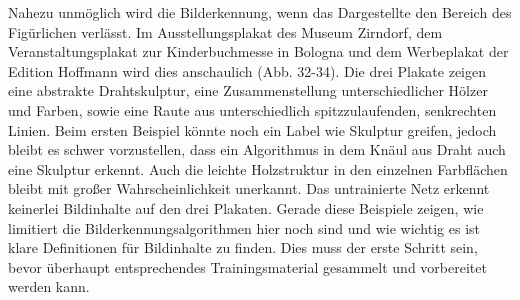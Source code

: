 \documentclass[a4paper,12pt,ngerman]{article}
\begin{document}
Nahezu unmöglich wird die Bilderkennung, wenn das Dargestellte den Bereich des Figürlichen verlässt. Im Ausstellungsplakat des Museum Zirndorf, dem Veranstaltungsplakat zur Kinderbuchmesse in Bologna und dem Werbeplakat der Edition Hoffmann wird dies anschaulich (Abb. 32-34). Die drei Plakate zeigen eine abstrakte Drahtskulptur, eine Zusammenstellung unterschiedlicher Hölzer und Farben, sowie eine Raute aus unterschiedlich spitzzulaufenden, senkrechten Linien. Beim ersten Beispiel könnte noch ein Label wie Skulptur greifen, jedoch bleibt es schwer vorzustellen, dass ein Algorithmus in dem Knäul aus Draht auch eine Skulptur erkennt. Auch die leichte Holzstruktur in den einzelnen Farbflächen bleibt mit großer Wahrscheinlichkeit unerkannt. Das untrainierte Netz erkennt keinerlei Bildinhalte auf den drei Plakaten. Gerade diese Beispiele zeigen, wie limitiert die Bilderkennungsalgorithmen hier noch sind und wie wichtig es ist klare Definitionen für Bildinhalte zu finden. Dies muss der erste Schritt sein, bevor überhaupt entsprechendes Trainingsmaterial gesammelt und vorbereitet werden kann. \\
\end{document}
